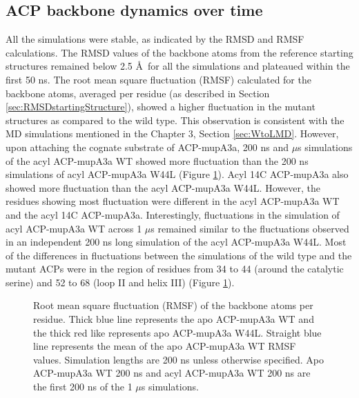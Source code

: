 	
	\subsection{ACP backbone dynamics over time}
	\label{sec:backbonedynamics}
	All the simulations were stable, as indicated by the RMSD and RMSF calculations. The RMSD values of the backbone atoms from the reference starting structures remained below 2.5 \AA \ for all the simulations and plateaued within the first 50 ns. The root mean square fluctuation (RMSF)  calculated for the backbone atoms, averaged per residue (as described in Section \ref{sec:RMSDstartingStructure}), showed a higher fluctuation in the mutant structures as compared to the wild type. This observation is consistent with the MD simulations mentioned in the Chapter 3, Section \ref{sec:WtoLMD}. However, upon attaching the cognate substrate of ACP-mupA3a, 200 ns and $ \mu $s simulations of the acyl ACP-mupA3a WT showed more fluctuation than the 200 ns simulations of acyl ACP-mupA3a W44L (Figure \ref{fig:allrmsf}). Acyl 14C ACP-mupA3a also showed more fluctuation than the acyl ACP-mupA3a W44L. However, the residues showing most fluctuation were different in the acyl ACP-mupA3a WT and the acyl 14C ACP-mupA3a. Interestingly, fluctuations in the simulation of acyl ACP-mupA3a WT across 1 $ \mu $s remained similar to the fluctuations observed in an independent 200 ns long simulation of the acyl ACP-mupA3a W44L.  Most of the differences in fluctuations between the simulations of the wild type and the mutant ACPs were in the region of residues from 34 to 44 (around the catalytic serine) and 52 to 68 (loop II and helix III) (Figure \ref{fig:allrmsf}). 

		\setlength\fboxsep{5pt}
		\setlength\fboxrule{1.5pt}
		\begin{figure}
		\centering
		\caption[Root mean square fluctuation (RMSF) of the backbone atoms per residue.]{Root mean square fluctuation (RMSF) of the backbone atoms per residue. Thick blue line represents the apo ACP-mupA3a WT and the thick red like represents apo ACP-mupA3a W44L. Straight blue line represents the mean of the apo ACP-mupA3a WT RMSF values. Simulation lengths are 200 ns unless otherwise specified. Apo ACP-mupA3a WT 200 ns and acyl ACP-mupA3a WT 200 ns are the first 200 ns of the 1 $ \mu $s simulations.}
		\label{fig:allrmsf}
		\end{figure}	

